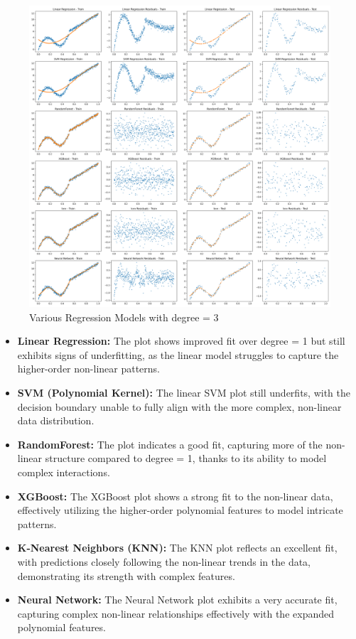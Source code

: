 \begin{figure}[H]
	\centering
	\includegraphics[width=0.8\linewidth]{./Images/E3-MLR3-3.png}
	\caption{Various Regression Models with degree = 3}
\end{figure}

\begin{itemize}
    \item \textbf{Linear Regression:} The plot shows improved fit over degree = 1 but still exhibits signs of underfitting, as the linear model struggles to capture the higher-order non-linear patterns.
    \item \textbf{SVM (Polynomial Kernel):} The linear SVM plot still underfits, with the decision boundary unable to fully align with the more complex, non-linear data distribution.
    \item \textbf{RandomForest:} The plot indicates a good fit, capturing more of the non-linear structure compared to degree = 1, thanks to its ability to model complex interactions.
    \item \textbf{XGBoost:} The XGBoost plot shows a strong fit to the non-linear data, effectively utilizing the higher-order polynomial features to model intricate patterns.
    \item \textbf{K-Nearest Neighbors (KNN):} The KNN plot reflects an excellent fit, with predictions closely following the non-linear trends in the data, demonstrating its strength with complex features.
    \item \textbf{Neural Network:} The Neural Network plot exhibits a very accurate fit, capturing complex non-linear relationships effectively with the expanded polynomial features.
\end{itemize}


